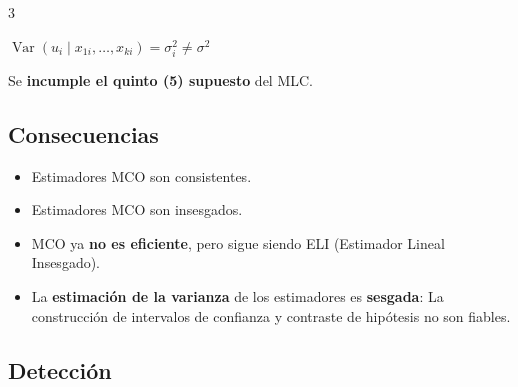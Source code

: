 \documentclass[10pt, a4paper, landscape]{article}
\DeclareMathOperator{\Var}{Var}
\begin{document}
\begin{multicols}{3}
\begin{center}
	\( \Var(u_{i} \mid x_{1i}, \ldots, x_{ki}) = \sigma_{i}^{2} \neq \sigma^{2} \)
\end{center}

Se \textbf{incumple el quinto (5) supuesto} del MLC.

\subsection*{Consecuencias}

\begin{itemize}[leftmargin=*]
	\item Estimadores MCO son consistentes.
	\item Estimadores MCO son insesgados.
	\item MCO ya \textbf{no es eficiente}, pero sigue siendo ELI (Estimador Lineal Insesgado).
	\item La \textbf{estimación de la varianza} de los estimadores es \textbf{sesgada}: La construcción de intervalos de confianza y contraste de hipótesis no son fiables.
\end{itemize}

\subsection*{Detección}


\end{multicols}
\end{document}
